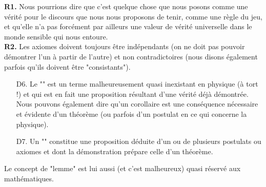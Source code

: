 	\begin{tcolorbox}[title=Remarques,colframe=black,arc=10pt]
	\textbf{R1.} Nous pourrions dire que c'est quelque chose que nous posons comme une vérité pour le discours que nous nous proposons de tenir, comme une règle du jeu, et qu'elle n'a pas forcément par ailleurs une valeur de vérité universelle dans le monde sensible qui nous entoure.\\

	\textbf{R2.} Les axiomes doivent toujours être indépendants (on ne doit pas pouvoir démontrer l'un à partir de l'autre) et non contradictoires (nous disons également parfois qu'ils doivent être "consistants").
	\end{tcolorbox}	
	
\begin{itemize}
	\item[D6.]  Le "" est un terme malheureusement quasi inexistant en physique (à tort !) et qui est en fait une proposition résultant d'une vérité déjà démontrée. Nous pouvons également dire qu'un corollaire est une conséquence nécessaire et évidente d'un théorème (ou parfois d'un postulat en ce qui concerne la physique).

	\item[D7.] Un "" constitue une proposition déduite d'un ou de plusieurs postulats ou axiomes et dont la démonstration prépare celle d'un théorème.
\end{itemize}

	\begin{tcolorbox}[title=Remark,colframe=black,arc=10pt]
	Le concept de "lemme" est lui aussi (et c'est malheureux) quasi réservé aux mathématiques.
	\end{tcolorbox}	

